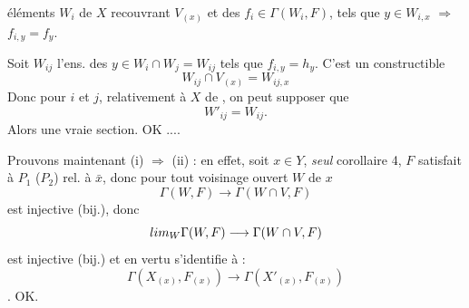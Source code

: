 \documentclass[11pt,a4paper]{article}
\begin{document}

\ill{} éléments $W_i$ de $X$ recouvrant $V_{(x)}$ \ill{} et des $f_i \in \Gamma(W_i,F)$, tels que $y \in W_{i,x}$ \struck{\ill{}} $\Rightarrow$ $f_{i,y} = f_y$.

Soit \struck{\ill{}} $W_{ij}$ l'ens. des $y \in W_i \cap W_j = W_{ij}$ tels que $f_{i,y} = h_y$.  C'est un \struck{\ill{}} \add{\ill{}} constructible \ill{}
\[
  W_{ij} \cap V_{(x)} = W_{ij,x}
\]
Donc \ill{} \ill{} pour $i$ et $j$, \ill{} relativement à $X$ \ill{} \ill{} de \struck{\ill{}}, on peut supposer que
\[
  W'_{ij} = W_{ij} .
\]
Alors \ill{} \ill{} \ill{} \ill{} une vraie section. OK ....


Prouvons maintenant (i) $\Rightarrow$ (ii) : en effet, soit $x \in Y$, \struck{\ill{}} \ill{} \ill{} \emph{seul} \ill{} corollaire 4, $F$ satisfait à $P_1$ ($P_2$) rel. à $\bar{x}$, donc  \ill{} \ill{} \ill{} pour tout voisinage ouvert $W$ de $x$
\[
  \Gamma(W,F) \longrightarrow \Gamma(W \cap V, F)
\]
est injective (bij.), donc
\[
  \varinjlim_W \Gamma(W,F) \longrightarrow \Gamma(W \cap V, F)
\]
est injective (bij.) et en vertu \ill{} s'identifie à :
\[
  \Gamma(X_{(x)}, F_{(x)}) \longrightarrow \Gamma(X'_{(x)}, F_{(x)})
\]
\ill{} . OK.
\end{document}
